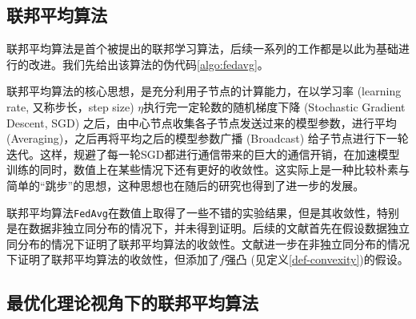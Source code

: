 \subsection{联邦平均算法}
\label{subsec:chap2-overview-fedavg}

联邦平均算法\cite{mcmahan2017fed_avg}是首个被提出的联邦学习算法，后续一系列的工作都是以此为基础进行的改进。我们先给出该算法的伪代码\ref{algo:fedavg}。



联邦平均算法的核心思想，是充分利用子节点的计算能力，在以学习率 (learning rate, 又称步长，step size) $\eta$执行完一定轮数的随机梯度下降 (Stochastic Gradient Descent, SGD)\cite{Robbins_1951_sgd} 之后，由中心节点收集各子节点发送过来的模型参数，进行平均 (Averaging)，之后再将平均之后的模型参数广播 (Broadcast) 给子节点进行下一轮迭代。这样，规避了每一轮SGD都进行通信带来的巨大的通信开销，在加速模型训练的同时，数值上在某些情况下还有更好的收敛性。这实际上是一种比较朴素与简单的``跳步''的思想，这种思想也在随后的研究\cite{zhang2020fedpd, proxskip, proxskip-vr}也得到了进一步的发展。

联邦平均算法\texttt{FedAvg}在数值上取得了一些不错的实验结果\cite[Section 3]{mcmahan2017fed_avg}，但是其收敛性，特别是在数据非独立同分布的情况下，并未得到证明\cite{khaled2019_first,Khaled2020_tighter}。后续的文献\parencite{zhou_2018_convergence}首先在假设数据独立同分布的情况下证明了联邦平均算法的收敛性。文献\parencite{li2019convergence}进一步在非独立同分布的情况下证明了联邦平均算法的收敛性，但添加了$f$强凸 (见定义\ref{def-convexity})的假设。


\subsection{最优化理论视角下的联邦平均算法}
\label{subsec:chap2-overview-fedavg-opt}

